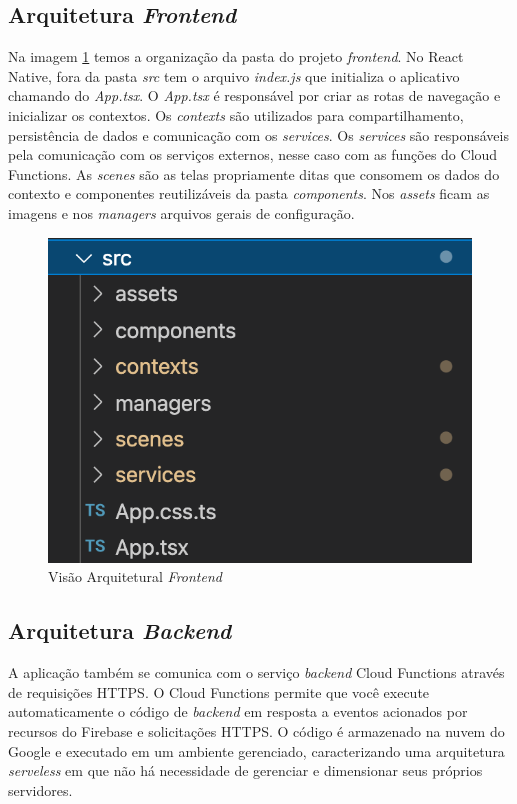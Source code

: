 \subsection{Arquitetura \emph{Frontend}}

Na imagem \ref{fig13} temos a organização da pasta do projeto \emph{frontend}. No React Native, fora 
da pasta \emph{src} tem o arquivo \emph{index.js} que initializa o aplicativo chamando do \emph{App.tsx}. 
O \emph{App.tsx} é responsável 
por criar as rotas de navegação e inicializar os contextos. Os \emph{contexts} são utilizados 
para compartilhamento, 
persistência de dados e comunicação com os \emph{services}. Os \emph{services} são responsáveis pela 
comunicação com 
os serviços externos, nesse caso com as funções do Cloud Functions. As \emph{scenes} são as 
telas propriamente ditas 
que consomem os dados do contexto e componentes reutilizáveis da pasta \emph{components}. 
Nos \emph{assets} ficam as imagens e 
nos \emph{managers} arquivos gerais de configuração. 


\begin{figure}[ht]
    \centering
    \includegraphics[keepaspectratio=true,scale=0.6]{figuras/frontend.png}
    \caption{Visão Arquitetural \emph{Frontend}}
        \label{fig13}
\end{figure}
\subsection{Arquitetura \emph{Backend}}

A aplicação também se comunica com o serviço \emph{backend} Cloud Functions através de requisições HTTPS.
O Cloud Functions permite que você execute automaticamente o código de \emph{backend} em resposta a 
eventos acionados por recursos do Firebase e solicitações HTTPS. 
O código é armazenado na nuvem do Google e executado em um ambiente gerenciado, caracterizando 
uma arquitetura \emph{serveless} em que não há necessidade de gerenciar e dimensionar seus 
próprios servidores. 

